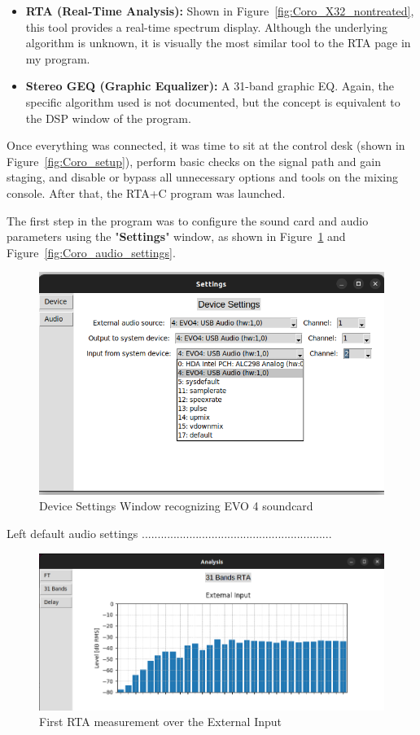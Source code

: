\begin{itemize}
	\item \textbf{RTA (Real-Time Analysis):} Shown in Figure~\ref{fig:Coro_X32_nontreated}, this tool provides a real-time spectrum display. Although the underlying algorithm is unknown, it is visually the most similar tool to the RTA page in my program.
	\item \textbf{Stereo GEQ (Graphic Equalizer):} A 31-band graphic EQ. Again, the specific algorithm used is not documented, but the concept is equivalent to the DSP window of the program.
\end{itemize}

Once everything was connected, it was time to sit at the control desk (shown in Figure~\ref{fig:Coro_setup}), perform basic checks on the signal path and gain staging, and disable or bypass all unnecessary options and tools on the mixing console. After that, the RTA+C program was launched.

The first step in the program was to configure the sound card and audio parameters using the "\textbf{Settings}" window, as shown in Figure~\ref{fig:Coro_device_settings} and Figure~\ref{fig:Coro_audio_settings}.


\begin{figure}[H]
	\centering
	\includegraphics[width=0.6
	\linewidth]{Figures/Coro_Device_settings.png}
	\caption{Device Settings Window recognizing EVO 4 soundcard}
	\label{fig:Coro_device_settings}
\end{figure}

Left default audio settings ............................................................

\begin{figure}[H]
	\centering
	\includegraphics[width=0.6
	\linewidth]{Figures/Coro_Pink_Bad.png}
	\caption{First RTA measurement over the External Input}
	\label{fig:Coro_Bad_Pink}
\end{figure}

